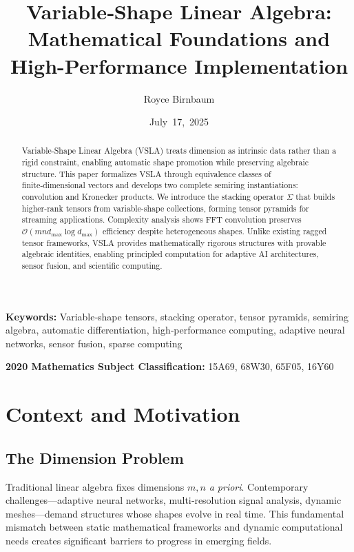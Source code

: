 \documentclass[11pt]{article}
\title{Variable‑Shape Linear Algebra: Mathematical Foundations and High-Performance Implementation}
\author{Royce Birnbaum}
\date{July 17, 2025}
\newcommand{\keywords}[1]{\textbf{Keywords:} #1}
\newcommand{\msc}[1]{\textbf{2020 Mathematics Subject Classification:} #1}
\begin{document}
\maketitle

\begin{abstract}
Variable‑Shape Linear Algebra (VSLA) treats dimension as intrinsic data rather than a rigid constraint, enabling automatic shape promotion while preserving algebraic structure. This paper formalizes VSLA through equivalence classes of finite‑dimensional vectors and develops two complete semiring instantiations: convolution and Kronecker products. We introduce the stacking operator $\Sigma$ that builds higher-rank tensors from variable-shape collections, forming tensor pyramids for streaming applications. Complexity analysis shows FFT convolution preserves $\mathcal{O}(mn d_{\max} \log d_{\max})$ efficiency despite heterogeneous shapes. Unlike existing ragged tensor frameworks, VSLA provides mathematically rigorous structures with provable algebraic identities, enabling principled computation for adaptive AI architectures, sensor fusion, and scientific computing.
\end{abstract}

\vspace{0.5em}
\noindent\keywords{Variable‑shape tensors, stacking operator, tensor pyramids, semiring algebra, automatic differentiation, high‑performance computing, adaptive neural networks, sensor fusion, sparse computing}

\vspace{1em}
\noindent\msc{15A69, 68W30, 65F05, 16Y60}

\section{Context and Motivation}
\subsection{The Dimension Problem}
Traditional linear algebra fixes dimensions \(m,n\) \emph{a priori}.  Contemporary challenges—adaptive neural networks, multi‑resolution signal analysis, dynamic meshes—demand structures whose shapes evolve in real time. This fundamental mismatch between static mathematical frameworks and dynamic computational needs creates significant barriers to progress in emerging fields.
\end{document}
